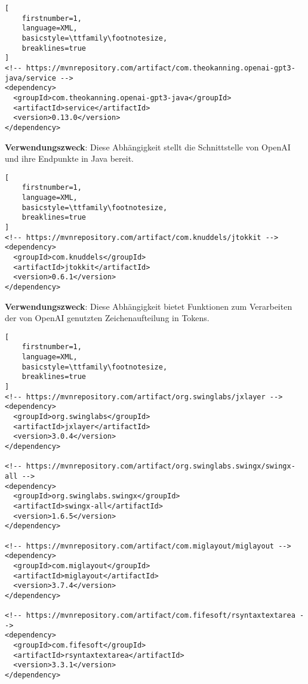 \begin{tcolorbox}
    [enhanced,
     colback=white,
     colbacktitle=white,
     coltitle=black,
     title=OpenAI-Java,
     toptitle=1.5mm,
     bottomtitle=1.5mm,
     center title,
     breakable,
     segmentation style={solid}
]
\begin{lstlisting}[
    firstnumber=1,
    language=XML,
    basicstyle=\ttfamily\footnotesize,
    breaklines=true
]
<!-- https://mvnrepository.com/artifact/com.theokanning.openai-gpt3-java/service -->
<dependency>
  <groupId>com.theokanning.openai-gpt3-java</groupId>
  <artifactId>service</artifactId>
  <version>0.13.0</version>
</dependency>
\end{lstlisting}
\tcbline
\textbf{Verwendungszweck}: Diese Abhängigkeit stellt die Schnittstelle von OpenAI und ihre Endpunkte in Java bereit.
\end{tcolorbox}

\begin{tcolorbox}
    [enhanced,
     colback=white,
     colbacktitle=white,
     coltitle=black,
     title=JTokkit,
     toptitle=1.5mm,
     bottomtitle=1.5mm,
     center title,
     breakable,
     segmentation style={solid}
]
\begin{lstlisting}[
    firstnumber=1,
    language=XML,
    basicstyle=\ttfamily\footnotesize,
    breaklines=true
]
<!-- https://mvnrepository.com/artifact/com.knuddels/jtokkit -->
<dependency>
  <groupId>com.knuddels</groupId>
  <artifactId>jtokkit</artifactId>
  <version>0.6.1</version>
</dependency>
\end{lstlisting}
\tcbline
\textbf{Verwendungszweck}: Diese Abhängigkeit bietet Funktionen zum Verarbeiten der von OpenAI genutzten Zeichenaufteilung in Tokens.
\end{tcolorbox}

\begin{tcolorbox}
    [enhanced,
     colback=white,
     colbacktitle=white,
     coltitle=black,
     title=Abhängigkeiten für die Benutzeroberfläche,
     toptitle=1.5mm,
     bottomtitle=1.5mm,
     center title,
     breakable,
     segmentation style={solid}
]
\begin{lstlisting}[
    firstnumber=1,
    language=XML,
    basicstyle=\ttfamily\footnotesize,
    breaklines=true
]
<!-- https://mvnrepository.com/artifact/org.swinglabs/jxlayer -->
<dependency>
  <groupId>org.swinglabs</groupId>
  <artifactId>jxlayer</artifactId>
  <version>3.0.4</version>
</dependency>

<!-- https://mvnrepository.com/artifact/org.swinglabs.swingx/swingx-all -->
<dependency>
  <groupId>org.swinglabs.swingx</groupId>
  <artifactId>swingx-all</artifactId>
  <version>1.6.5</version>
</dependency>

<!-- https://mvnrepository.com/artifact/com.miglayout/miglayout -->
<dependency>
  <groupId>com.miglayout</groupId>
  <artifactId>miglayout</artifactId>
  <version>3.7.4</version>
</dependency>

<!-- https://mvnrepository.com/artifact/com.fifesoft/rsyntaxtextarea -->
<dependency>
  <groupId>com.fifesoft</groupId>
  <artifactId>rsyntaxtextarea</artifactId>
  <version>3.3.1</version>
</dependency>
\end{lstlisting}
\end{tcolorbox}

